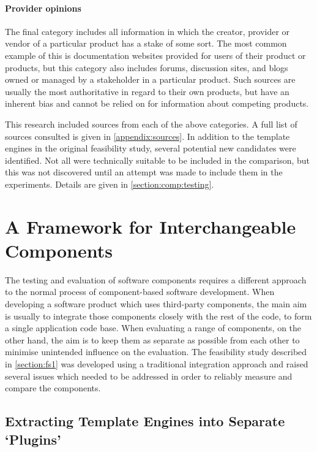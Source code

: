 \paragraph{Provider opinions} The final category includes all information in which the creator, provider or vendor of a particular product has a stake of some sort. The most common example of this is documentation websites provided for users of their product or products, but this category also includes forums, discussion sites, and blogs owned or managed by a stakeholder in a particular product. Such sources are usually the most authoritative in regard to their own products, but have an inherent bias and cannot be relied on for information about competing products.

This research included sources from each of the above categories. A full list of sources consulted is given in \autoref{appendix:sources}. In addition to the template engines in the original feasibility study, several potential new candidates were identified. Not all were technically suitable to be included in the comparison, but this was not discovered until an attempt was made to include them in the experiments. Details are given in \autoref{section:comp:testing}.

\section{A Framework for Interchangeable Components}
\label{section:comp:framework}

The testing and evaluation of software components requires a different approach to the normal process of component-based software development. When developing a software product which uses third-party components, the main aim is usually to integrate those components closely with the rest of the code, to form a single application code base. When evaluating a range of components, on the other hand, the aim is to keep them as separate as possible from each other to minimise unintended influence on the evaluation. The feasibility study described in \autoref{section:fs1} was developed using a traditional integration approach and raised several issues which needed to be addressed in order to reliably measure and compare the components.

\subsection{Extracting Template Engines into Separate `Plugins'}
\label{section:comp:plugins}

